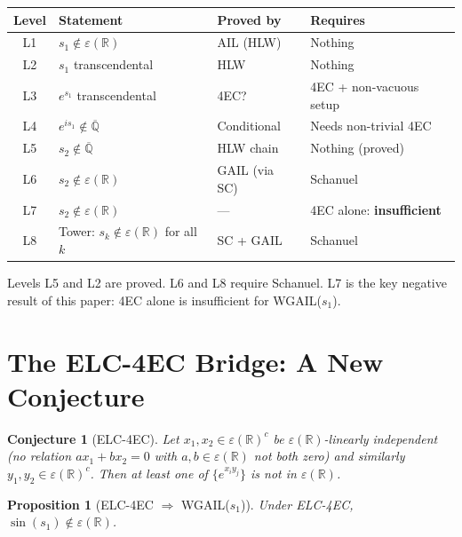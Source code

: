 \documentclass[11pt]{article}
\newtheorem{proposition}[theorem]{Proposition}
\newtheorem{conjecture}[theorem]{Conjecture}
\begin{document}
\begin{center}
\renewcommand{\arraystretch}{1.3}
\begin{tabular}{clll}
\toprule
Level & Statement & Proved by & Requires \\
\midrule
L1 & $s_1 \notin \varepsilon(\mathbb{R})$ & AIL (HLW) & Nothing \\
L2 & $s_1$ transcendental & HLW & Nothing \\
L3 & $e^{s_1}$ transcendental & 4EC? & 4EC + non-vacuous setup \\
L4 & $e^{is_1} \notin \overline{\mathbb{Q}}$ & Conditional & Needs non-trivial 4EC \\
L5 & $s_2 \notin \overline{\mathbb{Q}}$ & HLW chain & Nothing (proved) \\
L6 & $s_2 \notin \varepsilon(\mathbb{R})$ & GAIL (via SC) & Schanuel \\
L7 & $s_2 \notin \varepsilon(\mathbb{R})$ & --- & 4EC alone: \textbf{insufficient} \\
L8 & Tower: $s_k \notin \varepsilon(\mathbb{R})$ for all $k$ & SC + GAIL & Schanuel \\
\bottomrule
\end{tabular}
\end{center}

Levels L5 and L2 are proved. L6 and L8 require Schanuel. L7 is the key
negative result of this paper: 4EC alone is insufficient for WGAIL($s_1$).

\section{The ELC-4EC Bridge: A New Conjecture}

\begin{conjecture}[ELC-4EC]
\label{conj:elc4ec}
Let $x_1, x_2 \in \varepsilon(\mathbb{R})^c$ be $\varepsilon(\mathbb{R})$-linearly
independent (no relation $a x_1 + b x_2 = 0$ with $a, b \in \varepsilon(\mathbb{R})$
not both zero) and similarly $y_1, y_2 \in \varepsilon(\mathbb{R})^c$.
Then at least one of $\{e^{x_i y_j}\}$ is not in $\varepsilon(\mathbb{R})$.
\end{conjecture}

\begin{proposition}[ELC-4EC $\Rightarrow$ WGAIL($s_1$)]
\label{prop:elc4ec_implies}
Under ELC-4EC, $\sin(s_1) \notin \varepsilon(\mathbb{R})$.
\end{proposition}
\end{document}
